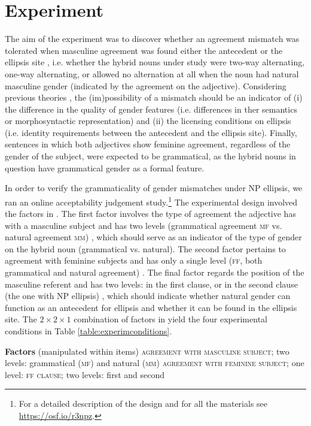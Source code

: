 \documentclass[output=paper,
modfonts,
newtxmath,
hidelinks
]{langscibook}
\begin{document}
     
\section{Experiment}

The aim of the experiment was to discover whether an agreement mismatch was tolerated when masculine agreement was found either the antecedent  or the ellipsis site , i.e. whether the hybrid nouns under study were two-way alternating, one-way alternating, or allowed no alternation at all when the noun had natural masculine gender  (indicated by the agreement on the adjective). Considering previous theories \citep{nuneszocca10,bobaljikzocca,merchant14,sudospathas-sub20}, the (im)possibility of a mismatch should be an indicator of (i) the difference in the quality of gender features (i.e. differences in ther semantics or morphosyntactic representation) and (ii) the licensing conditions on ellipsis (i.e. identity requirements between the antecedent and the ellipsis site). Finally, sentences in which both adjectives show feminine agreement, regardless of the gender of the subject, were expected to be grammatical, as the hybrid nouns in question have grammatical gender as a formal feature. 

In order to verify the grammaticality of gender mismatches under NP ellipsis, we ran an online acceptability judgement study.\footnote{For a detailed description of the design and for all the materials see \url{https://osf.io/r3npz}.} 
The experimental design involved the factors  in . The first factor involves the type of agreement the adjective has with a masculine subject and has two levels (grammatical agreement \textsc{mf} vs. natural agreement \textsc{mm}) , which should serve as an indicator of the type of gender on the hybrid noun (grammatical vs. natural).
The second factor pertains to agreement with feminine subjects and has only a single level (\textsc{ff}, both grammatical and natural agreement) . The final factor regards the position of the masculine referent and has two levels:
in the first clause, or in  the second clause (the one with NP ellipsis) , which should indicate whether natural gender can function as an antecedent for ellipsis and whether it can be found in the ellipsis site. The $2\times 2\times 1$ combination of factors in  yield the four experimental conditions in Table \ref{table:experimconditions}.

 \ea \textbf{Factors} (manipulated within items)\label{ex9}
  			\ea \textsc{agreement with masculine subject}; two levels: grammatical (\textsc{mf}) and natural (\textsc{mm})\label{ex9a}
  			\ex \textsc{agreement with feminine subject}; one level: \textsc{ff} \label{ex9b}
  			\ex \textsc{clause}; two levels: first and second\label{ex9c}
            \z \z
 
\end{document}

